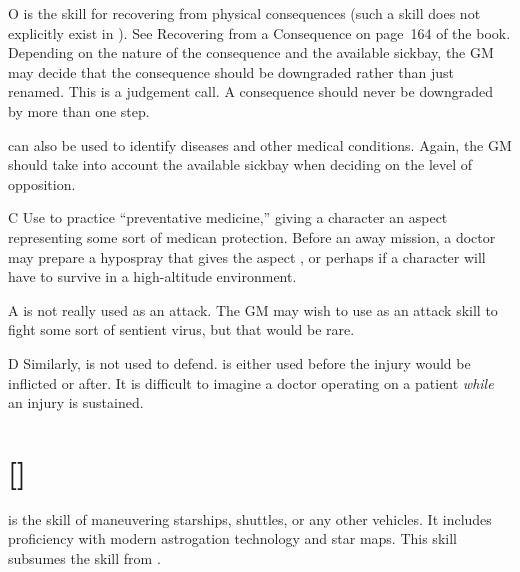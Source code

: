 \documentclass[12pt,titlepage,openany]{book}
\begin{document}
\vspace{1ex}

\begin{NewSkillAction}{O}
     is the skill for recovering from physical consequences
    (such a skill does not explicitly exist in \FateCore{}). See Recovering
    from a Consequence on page~164 of the \FateCore{} book. Depending on the
    nature of the consequence and the available sickbay, the GM may decide that
    the consequence should be downgraded rather than just renamed. This is a
    judgement call. A consequence should never be downgraded by more than one
    step.

     can also be used to identify diseases and other medical
    conditions. Again, the GM should take into account the available sickbay
    when deciding on the level of opposition.
\end{NewSkillAction}

\begin{NewSkillAction}{C}
    Use  to practice ``preventative medicine,'' giving a
    character an aspect representing some sort of medican protection. Before an
    away mission, a doctor may prepare a hypospray that gives the aspect
    , or perhaps  if a character will have to survive in a high-altitude environment.
\end{NewSkillAction}

\begin{NewSkillAction}{A}
     is not really used as an attack. The GM may wish to use
     as an attack skill to fight some sort of sentient virus,
    but that would be rare.
\end{NewSkillAction}

\begin{NewSkillAction}{D}
    Similarly,  is not used to defend.  is
    either used before the injury would be inflicted or after. It is difficult
    to imagine a doctor operating on a patient \emph{while} an injury is
    sustained.
\end{NewSkillAction}

\section{ []}\label{sec:pilot}

 is the skill of maneuvering starships, shuttles, or any other
vehicles. It includes proficiency with modern astrogation technology and star
maps. This skill subsumes the  skill from \FateCore{}.
\end{document}
